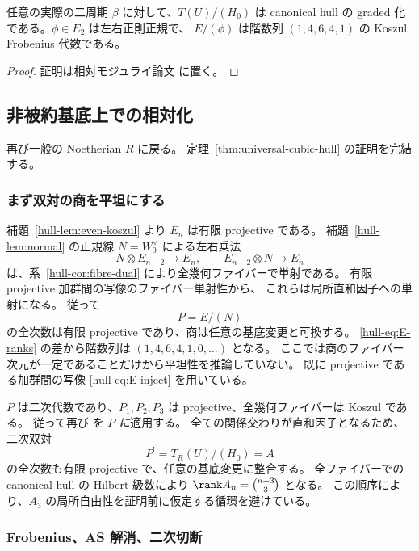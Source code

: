 \begin{corollary}[体上の双対と正則性]
\label{hull-cor:fibre-dual}
任意の実際の二周期 $\beta$ に対して、$T(U)/(H_0)$ は canonical hull の
graded 化である。$\phi\in E_2$ は左右正則正規で、
$E/(\phi)$ は階数列 $(1,4,6,4,1)$ の Koszul Frobenius 代数である。
\end{corollary}
\begin{proof}
証明は相対モジュライ論文 \cite[\texttt{universal_cubic_hull}]{QuadricModuli2026} に置く。
\end{proof}

\subsection{非被約基底上での相対化}

再び一般の Noetherian $R$ に戻る。
定理~\ref{thm:universal-cubic-hull} の証明を完結する。

\subsubsection{まず双対の商を平坦にする}

補題~\ref{hull-lem:even-koszul} より $E_n$ は有限 projective である。
補題~\ref{hull-lem:normal} の正規線 $N=W_0^{\vee}$ による左右乗法
\[
 N\otimes E_{n-2}\longrightarrow E_n,
 \qquad E_{n-2}\otimes N\longrightarrow E_n
 \tag{UH-16}\label{hull-eq:E-inject}
\]
は、系~\ref{hull-cor:fibre-dual} により全幾何ファイバーで単射である。
有限 projective 加群間の写像のファイバー単射性から、
これらは局所直和因子への単射になる。
従って
\[
 P=E/(N)
 \tag{UH-17}\label{hull-eq:P}
\]
の全次数は有限 projective であり、商は任意の基底変更と可換する。
\eqref{hull-eq:E-ranks} の差から階数列は $(1,4,6,4,1,0,\ldots)$ となる。
ここでは商のファイバー次元が一定であることだけから平坦性を推論していない。
既に projective である加群間の写像 \eqref{hull-eq:E-inject} を用いている。

$P$ は二次代数であり、$P_1,P_2,P_3$ は projective、全幾何ファイバーは Koszul である。
従って再び \cite[Chapter 6, Theorem 7.3]{PolishchukPositselski2005} を \emph{$P$ に}適用する。
全ての関係交わりが直和因子となるため、二次双対
\[
 P^!=T_R(U)/(H_0)=A
\]
の全次数も有限 projective で、任意の基底変更に整合する。
全ファイバーでの canonical hull の Hilbert 級数により
$\rank A_n=\binom{n+3}{3}$ となる。
この順序により、$A_3$ の局所自由性を証明前に仮定する循環を避けている。

\subsubsection{Frobenius、AS 解消、二次切断}

